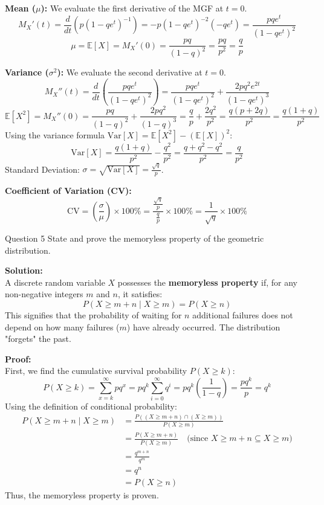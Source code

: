 \documentclass[11pt, a4paper]{article}
\newcommand{\E}{\mathbb{E}}
\newcommand{\Var}{\mathrm{Var}}
\newcommand{\CV}{\mathrm{CV}}
\begin{document}
\noindent\textbf{Mean ($\mu$):} We evaluate the first derivative of the MGF at $t=0$.
\[ M_X'(t) = \frac{d}{dt} \left( p(1 - qe^t)^{-1} \right) = -p(1 - qe^t)^{-2}(-qe^t) = \frac{pqe^t}{(1 - qe^t)^2} \]
\[ \mu = \E[X] = M_X'(0) = \frac{pq}{(1 - q)^2} = \frac{pq}{p^2} = \frac{q}{p} \]

\noindent\textbf{Variance ($\sigma^2$):} We evaluate the second derivative at $t=0$.
\[ M_X''(t) = \frac{d}{dt} \left( \frac{pqe^t}{(1 - qe^t)^2} \right) = \frac{pqe^t}{(1 - qe^t)^2} + \frac{2pq^2e^{2t}}{(1 - qe^t)^3} \]
\[ \E[X^2] = M_X''(0) = \frac{pq}{(1 - q)^2} + \frac{2pq^2}{(1 - q)^3} = \frac{q}{p} + \frac{2q^2}{p^2} = \frac{q(p + 2q)}{p^2} = \frac{q(1+q)}{p^2} \]
Using the variance formula $\Var[X] = \E[X^2] - (\E[X])^2$:
\[ \Var[X] = \frac{q(1+q)}{p^2} - \frac{q^2}{p^2} = \frac{q + q^2 - q^2}{p^2} = \frac{q}{p^2} \]
Standard Deviation: $\sigma = \sqrt{\Var[X]} = \frac{\sqrt{q}}{p}$.

\noindent\textbf{Coefficient of Variation (CV):}
\[ \CV = \left( \frac{\sigma}{\mu} \right) \times 100\% = \frac{\frac{\sqrt{q}}{p}}{\frac{q}{p}} \times 100\% = \frac{1}{\sqrt{q}} \times 100\% \]

\vspace{0.5cm}
\begin{problem}{Question 5}
State and prove the memoryless property of the geometric distribution.
\end{problem}

\noindent\textbf{Solution:} \\
A discrete random variable $X$ possesses the \textbf{memoryless property} if, for any non-negative integers $m$ and $n$, it satisfies:
\[ P(X \ge m + n \mid X \ge m) = P(X \ge n) \]
This signifies that the probability of waiting for $n$ additional failures does not depend on how many failures ($m$) have already occurred. The distribution "forgets" the past.

\textbf{Proof:} \\
First, we find the cumulative survival probability $P(X \ge k)$:
\[ P(X \ge k) = \sum_{x=k}^{\infty} p q^x = p q^k \sum_{i=0}^{\infty} q^i = p q^k \left( \frac{1}{1-q} \right) = \frac{p q^k}{p} = q^k \]
Using the definition of conditional probability:
\begin{align*}
    P(X \ge m + n \mid X \ge m) &= \frac{P((X \ge m + n) \cap (X \ge m))}{P(X \ge m)} \\
    &= \frac{P(X \ge m + n)}{P(X \ge m)} \quad \text{(since $X \ge m+n \subseteq X \ge m$)} \\
    &= \frac{q^{m+n}}{q^m} \\
    &= q^n \\
    &= P(X \ge n)
\end{align*}
Thus, the memoryless property is proven.
\end{document}

